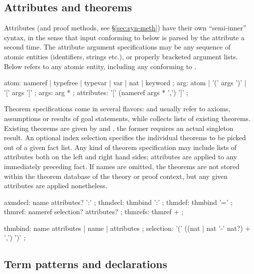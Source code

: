 \subsection{Attributes and theorems}\label{sec:syn-att}

Attributes (and proof methods, see \S\ref{sec:syn-meth}) have their own
``semi-inner'' syntax, in the sense that input conforming to
 below is parsed by the attribute a second time.  The
attribute argument specifications may be any sequence of atomic entities
(identifiers, strings etc.), or properly bracketed argument lists.  Below
 refers to any atomic entity, including any 
conforming to .

\begin{rail}
  atom: nameref | typefree | typevar | var | nat | keyword
  ;
  arg: atom | '(' args ')' | '[' args ']'
  ;
  args: arg *
  ;
  attributes: '[' (nameref args * ',') ']'
  ;
\end{rail}

Theorem specifications come in several flavors:  and
 usually refer to axioms, assumptions or results of goal
statements, while  collects lists of existing theorems.
Existing theorems are given by  and ,
the former requires an actual singleton result.  An optional index selection
specifies the individual theorems to be picked out of a given fact list.  Any
kind of theorem specification may include lists of attributes both on the left
and right hand sides; attributes are applied to any immediately preceding
fact.  If names are omitted, the theorems are not stored within the theorem
database of the theory or proof context, but any given attributes are applied
nonetheless.

\begin{rail}
  axmdecl: name attributes? ':'
  ;
  thmdecl: thmbind ':'
  ;
  thmdef: thmbind '='
  ;
  thmref: nameref selection? attributes?
  ;
  thmrefs: thmref +
  ;

  thmbind: name attributes | name | attributes
  ;
  selection: '(' ((nat | nat '-' nat?) + ',') ')'
  ;
\end{rail}


\subsection{Term patterns and declarations}\label{sec:term-decls}

